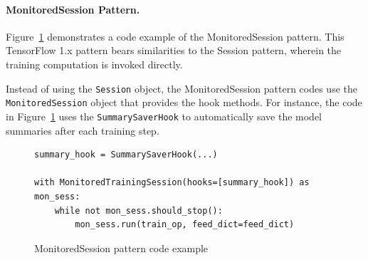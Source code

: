 \paragraph{MonitoredSession Pattern.}
Figure~\ref{fig:monsesspattern} demonstrates a code example of the
MonitoredSession pattern.
This TensorFlow 1.x pattern bears similarities to the Session pattern, 
wherein the training computation is invoked directly.
\begin{inred}
Instead of using the {\tt Session} object,
the MonitoredSession pattern codes use the {\tt MonitoredSession} object
that provides the hook methods.
For instance, the code in Figure~\ref{fig:monsesspattern}
uses the {\tt SummarySaverHook} to
automatically save the model summaries after each training step.
\end{inred}

\begin{figure}[!ht]
  \begin{lstlisting}[style=mpython]
summary_hook = SummarySaverHook(...)

with MonitoredTrainingSession(hooks=[summary_hook]) as mon_sess:
    while not mon_sess.should_stop():
        mon_sess.run(train_op, feed_dict=feed_dict)\end{lstlisting}
  \caption{MonitoredSession pattern code example}
  \label{fig:monsesspattern}
\end{figure}


